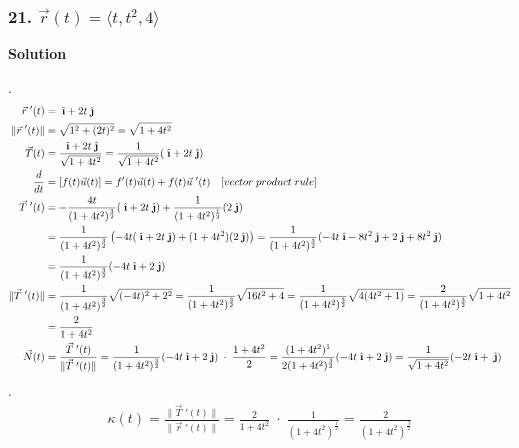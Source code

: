 \documentclass{article}
\newcommand{\ihat}{\;\hat{\textbf{\i}}}
\newcommand{\jhat}{\;\hat{\textbf{\j}}}
\newcommand{\drvec}{\vec{r}\;'(t)}
\begin{document}
\subsubsection*{21. $\vec{r}(t) = \langle{t, t^2, 4} \rangle$}
\centerline{\textbf{Solution}}
. 
\begin{align*}
    \drvec &=  \ihat +  2t\jhat \\ 
    \|\drvec\| &= \sqrt{1^2 + (2t)^2} = \sqrt{1 + 4t^2}  \\
    \vec T (t) &=  \frac{\ihat + 2t\jhat}{\sqrt{1 + 4t^2}} = \frac{1}{\sqrt{1 + 4t^2}}(\ihat + 2t\jhat) \\
    \frac{d}{dt} &= [f(t)\vec u (t)] = f'(t)\vec u (t) + f(t)\vec u \;'(t) \quad [vector\;product\;rule] \\  
    \vec T \;'(t) &= -\frac{4t}{(1+4t^2)^{\frac 3 2}}(\ihat + 2t\jhat) + \frac{1}{(1 + 4t^2)^{\frac 1 2}}(2\jhat) \\
                  &= \frac{1}{(1 + 4t^2)^{\frac 3 2}}\left(-4t(\ihat + 2t\jhat) + (1+4t^2)(2\jhat)\right) = \frac{1}{(1 + 4t^2)^{\frac 3 2}}(-4t\ihat - 8t^2\jhat + 2\jhat + 8t^2\jhat) \\
                  &= \frac{1}{(1 + 4t^2)^{\frac 3 2}}(-4t\ihat + 2\jhat) \\
    \| \vec T \;'(t)\| &= \frac{1}{\left(1+4t^2\right)^{\frac 3 2}}\sqrt{(-4t)^2 + 2^2} = \frac{1}{(1 + 4t^2)^{\frac 3 2}} \sqrt{16t^2 + 4} = \frac{1}{(1 + 4t^2)^{\frac 3 2}}\sqrt{4(4t^2 + 1)} = \frac{2}{(1 + 4t^2)^{\frac 3 2}}\sqrt{1+4t^2} \\
                       &= \frac{2}{1+4t^2} \\
    \vec N (t) &=  \frac{\vec T\;'(t)}{\|\vec T\;'(t)\|} = \frac{1}{(1+4t^2)^{\frac 3 2}}(-4t\ihat + 2\jhat) \; \cdot \; \frac{1+4t^2}{2} = \frac{(1+4t^2)^1}{2(1+4t^2)^{\frac 3 2}}(-4t\ihat + 2\jhat) = \frac{1}{\sqrt{1+4t^2}}(-2t\ihat + \jhat)
\end{align*}
.
\begin{align*}
    \kappa (t) = \frac{\|\vec T\;'(t)\|}{\|\drvec\|} = \frac{2}{1+4t^2} \;\cdot\; \frac{1}{(1+4t^2)^\frac 1 2} = \frac{2}{(1+4t^2)^{\frac 3 2}}
\end{align*}
\end{document}
